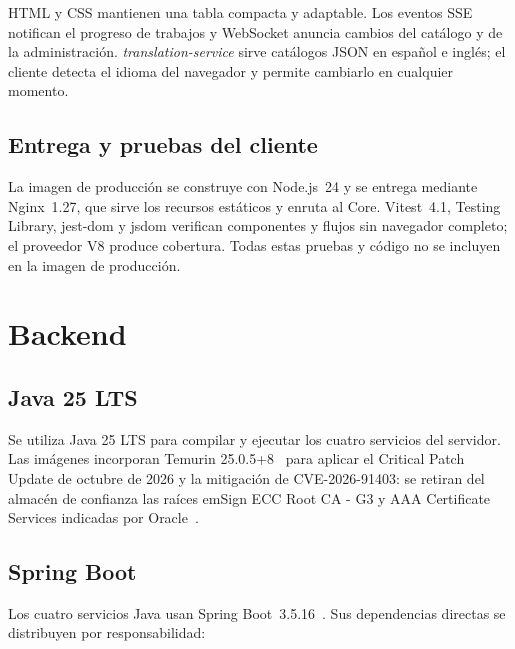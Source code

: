 HTML y CSS mantienen una tabla compacta y adaptable. Los eventos SSE notifican el progreso de trabajos y WebSocket anuncia cambios del catálogo y de la administración. \emph{translation-service} sirve catálogos JSON en español e inglés; el cliente detecta el idioma del navegador y permite cambiarlo en cualquier momento.

\subsection{Entrega y pruebas del cliente}

La imagen de producción se construye con Node.js~24 y se entrega mediante Nginx~1.27, que sirve los recursos estáticos y enruta  al Core. Vitest~4.1, Testing Library, jest-dom y jsdom verifican componentes y flujos sin navegador completo; el proveedor V8 produce cobertura. Todas estas pruebas y código no se incluyen en la imagen de producción.

\section{Backend}

\subsection{Java 25 LTS}

Se utiliza Java 25 LTS para compilar y ejecutar los cuatro servicios del servidor. Las imágenes incorporan Temurin 25.0.5+8~\cite{java25} para aplicar el Critical Patch Update de octubre de 2026 y la mitigación de CVE-2026-91403: se retiran del almacén de confianza las raíces emSign ECC Root CA - G3 y AAA Certificate Services indicadas por Oracle~\cite{oracle-cpu-oct2026,oracle-cve-2026-91403,oracle-emudhra-mitigation}.
\subsection{Spring Boot}

Los cuatro servicios Java usan Spring Boot~3.5.16~\cite{springboot}. Sus dependencias directas se distribuyen por responsabilidad:

